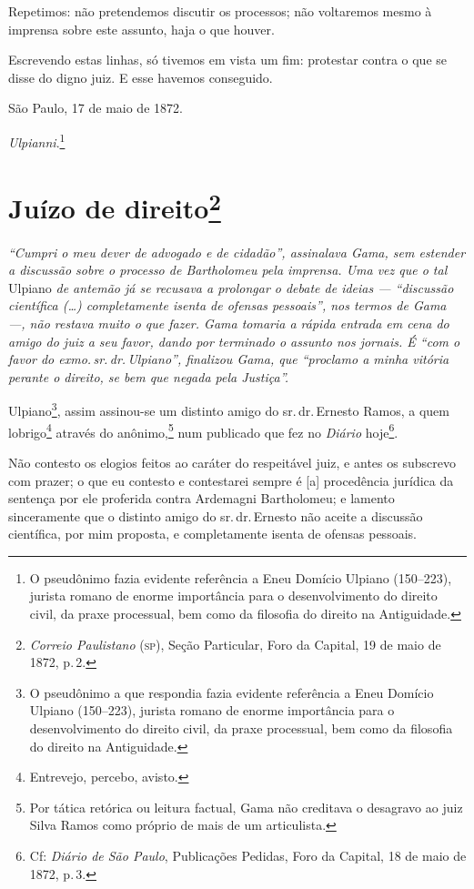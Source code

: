 Repetimos: não pretendemos discutir os processos; não voltaremos mesmo à
imprensa sobre este assunto, haja o que houver.

Escrevendo estas linhas, só tivemos em vista um fim: protestar contra o
que se disse do digno juiz. E esse havemos conseguido.

São Paulo, 17 de maio de 1872.

\emph{Ulpianni}.\footnote{ O pseudônimo fazia evidente referência a
  Eneu Domício Ulpiano (150--223), jurista romano de enorme importância
  para o desenvolvimento do direito civil, da praxe processual, bem como
  da filosofia do direito na Antiguidade.}

\chapter{Juízo de direito\footnote{\emph{Correio Paulistano} (\textsc{sp}), Seção Particular, Foro
  da Capital, 19 de maio de 1872, p.\,2.}} %

\begin{didascalia}
\emph{``Cumpri o meu dever de advogado e de cidadão'', assinalava Gama,
sem estender a discussão sobre o processo de Bartholomeu pela imprensa.
Uma vez que o tal} Ulpiano \emph{de antemão já se recusava a prolongar o
debate de ideias --- ``discussão científica (\ldots{}) completamente isenta de
ofensas pessoais'', nos termos de Gama ---, não restava muito o que fazer.
Gama tomaria a rápida entrada em cena do amigo do juiz a seu favor,
dando por terminado o assunto nos jornais. É ``com o favor do exmo.\,sr.\,dr.\,Ulpiano'', finalizou Gama, que ``proclamo a minha vitória perante o
direito, se bem que negada pela Justiça''.}
\end{didascalia}

Ulpiano\footnote{ O pseudônimo a que respondia fazia evidente
  referência a Eneu Domício Ulpiano (150--223), jurista romano de enorme
  importância para o desenvolvimento do direito civil, da praxe
  processual, bem como da filosofia do direito na Antiguidade.}, assim
assinou-se um distinto amigo do sr.\,dr.\,Ernesto Ramos, a quem
lobrigo\footnote{ Entrevejo, percebo, avisto.} através do
anônimo,\footnote{ Por tática retórica ou leitura factual, Gama não
  creditava o desagravo ao juiz Silva Ramos como próprio de mais de um
  articulista.} num publicado que fez no \emph{Diário} hoje\footnote{
  Cf: \emph{Diário de São Paulo}, Publicações Pedidas, Foro da Capital,
  18 de maio de 1872, p.\,3.}.

Não contesto os elogios feitos ao caráter do respeitável juiz, e antes
os subscrevo com prazer; o que eu contesto e contestarei sempre é
{[}a{]} procedência jurídica da sentença por ele proferida contra
Ardemagni Bartholomeu; e lamento sinceramente que o distinto amigo do
sr.\,dr.\,Ernesto não aceite a discussão científica, por mim proposta, e
completamente isenta de ofensas pessoais.

